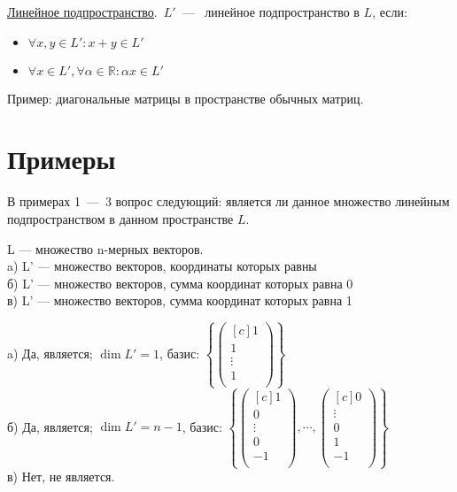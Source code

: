 \begin{definition}
	\underline{Линейное подпространство}.~$L'$~---~ линейное подпространство в $L$, если:
	\begin{itemize}
		\item $\forall x, y \in L': x + y \in L'$ %
		\item $\forall x \in L', \forall \alpha \in \mathbb{R} : \alpha x \in L'$
	\end{itemize}
\end{definition}

Пример: диагональные матрицы в пространстве обычных матриц.
\section{Примеры}
В примерах 1~---~3 вопрос следующий: является ли данное множество линейным подпространством в данном пространстве $L$.
\begin{prim} %
	L --- множество n-мерных векторов.\\ %
	a) L' --- множество векторов, координаты которых равны\\
	б) L' --- множество векторов,  сумма координат которых равна 0\\
	в) L' --- множество векторов,  сумма координат которых равна 1\\
\end{prim}
a) Да, является;  $\dim L'=1$, базис: %
$\left\{
\begin{pmatrix*}[c] %
1\\ 
1\\ 
\vdots\\
1\\ 
\end{pmatrix*}
\right\}$\\
б) Да, является;  $\dim  L'=n-1$, базис: 
$
\left\{ %
\begin{pmatrix*}[c] %
1\\ 
0\\ 
\vdots\\ 
0\\ 
-1\\
\end{pmatrix*}
, \cdots ,
\begin{pmatrix*}[c]
0\\ 
\vdots\\ 
0\\ 
1\\ 
-1\\
\end{pmatrix*}
\right\}$\\
в) Нет, не является.\\


